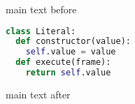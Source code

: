 \documentclass{article}
\begin{document}
main text before
\begin{lstlisting}[language=Python]
class Literal:
  def constructor(value):
    self.value = value
  def execute(frame):
    return self.value
\end{lstlisting}
main text after
\end{document}
